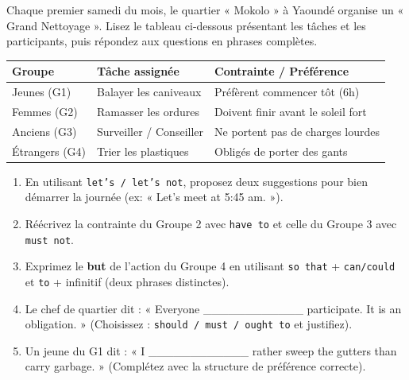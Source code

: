 \documentclass[11pt]{article}
\begin{document}
\begin{exercice}
Chaque premier samedi du mois, le quartier « Mokolo » à Yaoundé organise un « Grand Nettoyage ». Lisez le tableau ci-dessous présentant les tâches et les participants, puis répondez aux questions en phrases complètes.
\begin{center}
\begin{tabular}{|l|l|l|}
\hline
\textbf{Groupe} & \textbf{Tâche assignée} & \textbf{Contrainte / Préférence} \\
\hline
Jeunes (G1) & Balayer les caniveaux & Préfèrent commencer tôt (6h) \\
Femmes (G2) & Ramasser les ordures & Doivent finir avant le soleil fort \\
Anciens (G3) & Surveiller / Conseiller & Ne portent pas de charges lourdes \\
Étrangers (G4) & Trier les plastiques & Obligés de porter des gants \\
\hline
\end{tabular}
\end{center}
\begin{enumerate}
    \item En utilisant \texttt{let's / let's not}, proposez deux suggestions pour bien démarrer la journée (ex: « Let's meet at 5:45 am. »).
    \item Réécrivez la contrainte du Groupe 2 avec \texttt{have to} et celle du Groupe 3 avec \texttt{must not}.
    \item Exprimez le \textbf{but} de l'action du Groupe 4 en utilisant \texttt{so that} + \texttt{can/could} et \texttt{to} + infinitif (deux phrases distinctes).
    \item Le chef de quartier dit : « Everyone \_\_\_\_\_\_\_\_\_\_\_\_ participate. It is an obligation. » (Choisissez : \texttt{should / must / ought to} et justifiez).
    \item Un jeune du G1 dit : « I \_\_\_\_\_\_\_\_\_\_\_\_ rather sweep the gutters than carry garbage. » (Complétez avec la structure de préférence correcte).
\end{enumerate}
\end{exercice}
\end{document}
